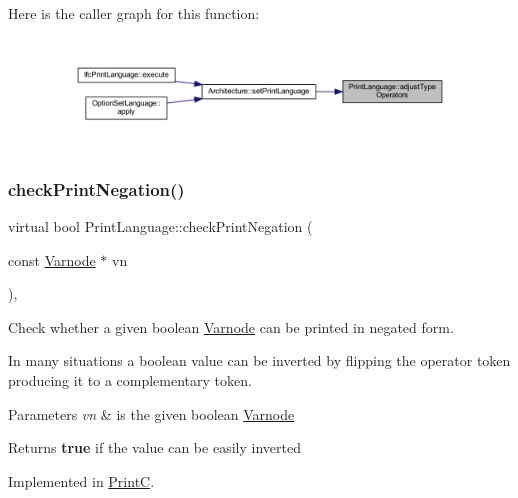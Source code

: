 Here is the caller graph for this function\+:
\nopagebreak
\begin{figure}[H]
\begin{center}
\leavevmode
\includegraphics[width=350pt]{class_print_language_afe7b69e9583dfd99d310d7fbcb447986_icgraph}
\end{center}
\end{figure}
\mbox{\label{class_print_language_a5ce2d6fc0fee85cdc030732d3825b154}} 
\subsubsection{\texorpdfstring{checkPrintNegation()}{checkPrintNegation()}}
{\footnotesize\ttfamily virtual bool Print\+Language\+::check\+Print\+Negation (\begin{DoxyParamCaption}\item[{const \mbox{\hyperlink{class_varnode}{Varnode}} $\ast$}]{vn }\end{DoxyParamCaption})\hspace{0.3cm}{\ttfamily [protected]}, {}}



Check whether a given boolean \mbox{\hyperlink{class_varnode}{Varnode}} can be printed in negated form. 

In many situations a boolean value can be inverted by flipping the operator token producing it to a complementary token. 
\begin{DoxyParams}{Parameters}
{\em vn} & is the given boolean \mbox{\hyperlink{class_varnode}{Varnode}} \\
\hline
\end{DoxyParams}
\begin{DoxyReturn}{Returns}
{\bfseries{true}} if the value can be easily inverted 
\end{DoxyReturn}


Implemented in \mbox{\hyperlink{class_print_c_ad1f1099f49b4169948682a34c5b9f9cb}{PrintC}}.

